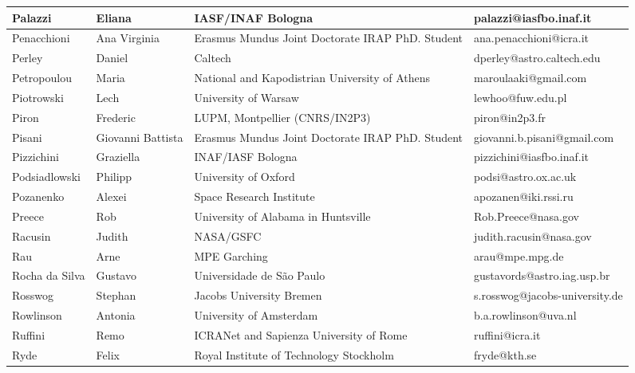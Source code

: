 \begin{center}
\begin{longtable}{|p{1.28cm} |p{1.28cm} |p{2.9cm} |p{3cm} |}
\tiny Palazzi &\tiny Eliana & \tiny IASF/INAF Bologna & \tiny palazzi@iasfbo.inaf.it \\ \hline
\tiny Penacchioni &\tiny Ana Virginia & \tiny Erasmus Mundus Joint Doctorate IRAP PhD. Student & \tiny ana.penacchioni@icra.it \\ \hline
\tiny Perley &\tiny Daniel & \tiny Caltech & \tiny dperley@astro.caltech.edu \\ \hline
\tiny Petropoulou &\tiny Maria & \tiny National and Kapodistrian University of Athens & \tiny maroulaaki@gmail.com \\ \hline
\tiny Piotrowski &\tiny Lech & \tiny University of Warsaw & \tiny lewhoo@fuw.edu.pl \\ \hline
\tiny Piron &\tiny Frederic & \tiny LUPM, Montpellier (CNRS/IN2P3) & \tiny piron@in2p3.fr \\ \hline
\tiny Pisani &\tiny Giovanni Battista & \tiny Erasmus Mundus Joint Doctorate IRAP PhD. Student & \tiny giovanni.b.pisani@gmail.com \\ \hline
\tiny Pizzichini &\tiny Graziella & \tiny INAF/IASF Bologna & \tiny pizzichini@iasfbo.inaf.it \\ \hline
\tiny Podsiadlowski &\tiny Philipp & \tiny University of Oxford & \tiny podsi@astro.ox.ac.uk \\ \hline
\tiny Pozanenko &\tiny Alexei & \tiny Space Research Institute & \tiny apozanen@iki.rssi.ru \\ \hline
\tiny Preece &\tiny Rob & \tiny University of Alabama in Huntsville & \tiny Rob.Preece@nasa.gov \\ \hline
\tiny Racusin &\tiny Judith & \tiny NASA/GSFC & \tiny judith.racusin@nasa.gov \\ \hline
\tiny Rau &\tiny Arne & \tiny MPE Garching & \tiny arau@mpe.mpg.de \\ \hline
\tiny Rocha da Silva &\tiny Gustavo & \tiny Universidade de S\~{a}o Paulo & \tiny gustavords@astro.iag.usp.br \\ \hline
\tiny Rosswog &\tiny Stephan & \tiny Jacobs University Bremen & \tiny s.rosswog@jacobs-university.de \\ \hline
\tiny Rowlinson &\tiny Antonia & \tiny University of Amsterdam & \tiny b.a.rowlinson@uva.nl \\ \hline
\tiny Ruffini &\tiny Remo & \tiny ICRANet and Sapienza University of Rome & \tiny ruffini@icra.it \\ \hline
\tiny Ryde &\tiny Felix & \tiny Royal Institute of Technology Stockholm & \tiny fryde@kth.se \\ \hline

\end{longtable}
\end{center}
